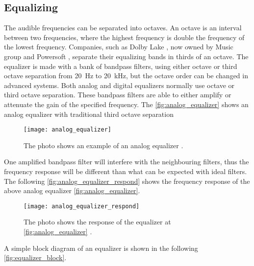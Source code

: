 \subsection{Equalizing}\label{sec:equalizing} 
The audible frequencies can be separated into octaves. An octave is an interval between two frequencies, where the highest frequency is double the frequency of the lowest frequency. Companies, such as Dolby Lake \citep{lab_gruppen_eq}, now owned by Music group and Powersoft \citep{powersoft_eq}, separate their equalizing bands in thirds of an octave. 
The equalizer is made with a bank of bandpass filters, using either octave or third octave separation from \SI{20}{\hertz} to \SI{20}{\kilo\hertz}, but the octave order can be changed in advanced systems. Both analog and digital equalizers normally use octave or third octave separation. These bandpass filters are able to either amplify or attenuate the gain of the specified frequency. The \autoref{fig:analog_equalizer} shows an analog equalizer with traditional third octave separation \citep{nordic}

\begin{figure} [htbp]
 \centering
  \texttt{[image: analog\_equalizer]}
  \caption{The photo shows an example of an analog equalizer \citep{nordic}.}
  \label{fig:analog_equalizer}
\end{figure}

One amplified bandpass filter will interfere with the neighbouring filters, thus the frequency response will be different than what can be expected with ideal filters. The following \autoref{fig:analog_equalizer_respond} shows the frequency response of the above analog equalizer \autoref{fig:analog_equalizer}.

\begin{figure} [htbp]
 \centering
  \texttt{[image: analog\_equalizer\_respond]}
  \caption{The photo shows the response of the equalizer at \autoref{fig:analog_equalizer} \citep{nordic}.}
  \label{fig:analog_equalizer_respond}
\end{figure}

A simple block diagram of an equalizer is shown in the following \autoref{fig:equalizer_block}.

